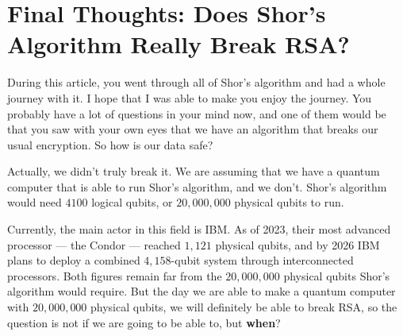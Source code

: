 \section{Final Thoughts: Does Shor's Algorithm Really Break RSA?}

During this article, you went through all of Shor's algorithm and had a whole
journey with it. I hope that I was able to make you enjoy the journey. You
probably have a lot of questions in your mind now, and one of them would be
that you saw with your own eyes that we have an algorithm that breaks our
usual encryption. So how is our data safe?

Actually, we didn't truly break it. We are assuming that we have a quantum
computer that is able to run Shor's algorithm, and we don't. Shor's algorithm
would need $4100$ logical qubits, or $20{,}000{,}000$ physical qubits to run.

Currently, the main actor in this field is IBM. As of 2023, their most advanced
processor --- the Condor --- reached $1{,}121$ physical qubits, and by 2026
IBM plans to deploy a combined $4{,}158$-qubit system through interconnected
processors. Both figures remain far from the $20{,}000{,}000$ physical qubits
Shor's algorithm would require. But the day we are able to make a quantum
computer with $20{,}000{,}000$ physical qubits, we will definitely be able to
break RSA, so the question is not if we are going to be able to, but
\textbf{when}?

